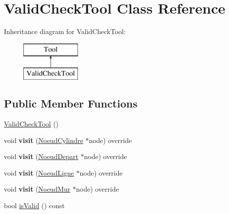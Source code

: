 \hypertarget{class_valid_check_tool}{}\section{Valid\+Check\+Tool Class Reference}
\label{class_valid_check_tool}
Inheritance diagram for Valid\+Check\+Tool\+:\begin{figure}[H]
\begin{center}
\leavevmode
\includegraphics[height=2.000000cm]{class_valid_check_tool}
\end{center}
\end{figure}
\subsection*{Public Member Functions}
\begin{DoxyCompactItemize}
\item 
\hyperlink{group__inf2990_ga4e827b025969ce7fa8204c6a62cf27c6}{Valid\+Check\+Tool} ()
\item 
\hypertarget{group__inf2990_ga032c8fa96e75b6300ce0ad8692250c0c}{}void {\bfseries visit} (\hyperlink{class_noeud_cylindre}{Noeud\+Cylindre} $\ast$node) override\label{group__inf2990_ga032c8fa96e75b6300ce0ad8692250c0c}

\item 
\hypertarget{group__inf2990_gab3f77ff9294703aa3b3806c505421136}{}void {\bfseries visit} (\hyperlink{class_noeud_depart}{Noeud\+Depart} $\ast$node) override\label{group__inf2990_gab3f77ff9294703aa3b3806c505421136}

\item 
\hypertarget{group__inf2990_gafca44465524d1775a36bc688eb03c43d}{}void {\bfseries visit} (\hyperlink{class_noeud_ligne}{Noeud\+Ligne} $\ast$node) override\label{group__inf2990_gafca44465524d1775a36bc688eb03c43d}

\item 
\hypertarget{group__inf2990_gad91e261311122bc94172813602534772}{}void {\bfseries visit} (\hyperlink{class_noeud_mur}{Noeud\+Mur} $\ast$node) override\label{group__inf2990_gad91e261311122bc94172813602534772}

\item 
bool \hyperlink{group__inf2990_ga8917a37ee52e2661d510c79a43a4032d}{is\+Valid} () const 
\end{DoxyCompactItemize}
